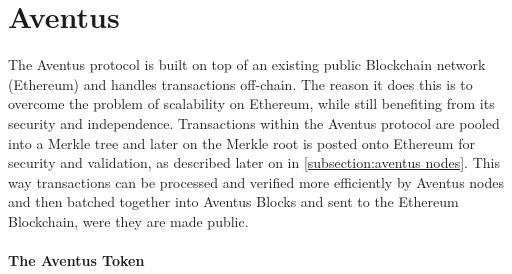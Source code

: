 
\section{Aventus}

\begin{comment}
\subsection{Problems}
\paragraph{Oversight}

The main problem here is defined as a lack of oversight over digital assets from the issuer of these assets/. Oversight is this context is defined as the ability for an issuer see exactly what is happening to their asset at any given moment in order to derive increased value from their digital assets.

\paragraph{Control}

Control allows an issuer to protect the value of their digital assets. In order to achieve total control, the issuer needs control over how their assets are created, managed, and sold.

A lack of control can lead to problems such as distribution of fake copies, price inflation in reselling markets, distribution by unauthorised vendors.
\end{comment}

The Aventus protocol is built on top of an existing public Blockchain network (Ethereum) and handles transactions off-chain. The reason it does this is to overcome the problem of scalability on Ethereum, while still benefiting from its security and independence.
Transactions within the Aventus protocol are pooled into a Merkle tree and later on the Merkle root is posted onto Ethereum for security and validation, as described later on in \ref{subsection:aventus nodes}.
This way transactions can be processed and verified more efficiently by Aventus nodes and then batched together into Aventus Blocks and sent to the Ethereum Blockchain, were they are made public.

\paragraph{The Aventus Token}

